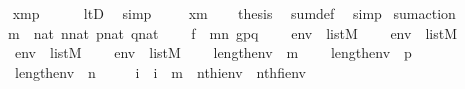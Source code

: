 \begin{isabellebody}
\ \ \isamarkupfalse%
\ {\isachardoublequoteopen}x{\isasymin}m{\isacharhash}{\kern0pt}{\isacharplus}{\kern0pt}p{\isachardoublequoteclose}\isanewline
\ \ \ \ \isamarkupfalse%
\ ltD\ \isamarkupfalse%
\ simp\isanewline
\ \ \isamarkupfalse%
\ {\isacartoucheopen}{\isasymnot}\ x{\isacharless}{\kern0pt}m{\isacartoucheclose}\isanewline
\ \ \isamarkupfalse%
\ {\isacharquery}{\kern0pt}thesis\ \isamarkupfalse%
\ sum{\isacharunderscore}{\kern0pt}def\ \isamarkupfalse%
\ simp\isanewline
{}\isamarkupfalse%
%
\endisatagproof
{\isafoldproof}%
%
\isadelimproof
\isanewline
%
\endisadelimproof
\isanewline
\isanewline
{}\isamarkupfalse%
\ sum{\isacharunderscore}{\kern0pt}action\ {\isacharcolon}{\kern0pt}\isanewline
\ \ \ {\isachardoublequoteopen}m\ {\isasymin}\ nat{\isachardoublequoteclose}\ {\isachardoublequoteopen}n{\isasymin}nat{\isachardoublequoteclose}\ {\isachardoublequoteopen}p{\isasymin}nat{\isachardoublequoteclose}\ {\isachardoublequoteopen}q{\isasymin}nat{\isachardoublequoteclose}\isanewline
\ \ \ \ {\isachardoublequoteopen}f\ {\isasymin}\ m{\isasymrightarrow}n{\isachardoublequoteclose}\ {\isachardoublequoteopen}g{\isasymin}p{\isasymrightarrow}q{\isachardoublequoteclose}\isanewline
\ \ \ \ {\isachardoublequoteopen}env\ {\isasymin}\ list{\isacharparenleft}{\kern0pt}M{\isacharparenright}{\kern0pt}{\isachardoublequoteclose}\isanewline
\ \ \ \ {\isachardoublequoteopen}env{\isacharprime}{\kern0pt}\ {\isasymin}\ list{\isacharparenleft}{\kern0pt}M{\isacharparenright}{\kern0pt}{\isachardoublequoteclose}\isanewline
\ \ \ \ {\isachardoublequoteopen}env{}\ {\isasymin}\ list{\isacharparenleft}{\kern0pt}M{\isacharparenright}{\kern0pt}{\isachardoublequoteclose}\isanewline
\ \ \ \ {\isachardoublequoteopen}env{}\ {\isasymin}\ list{\isacharparenleft}{\kern0pt}M{\isacharparenright}{\kern0pt}{\isachardoublequoteclose}\isanewline
\ \ \ \ {\isachardoublequoteopen}length{\isacharparenleft}{\kern0pt}env{\isacharparenright}{\kern0pt}\ {\isacharequal}{\kern0pt}\ m{\isachardoublequoteclose}\isanewline
\ \ \ \ {\isachardoublequoteopen}length{\isacharparenleft}{\kern0pt}env{}{\isacharparenright}{\kern0pt}\ {\isacharequal}{\kern0pt}\ p{\isachardoublequoteclose}\isanewline
\ \ \ \ {\isachardoublequoteopen}length{\isacharparenleft}{\kern0pt}env{\isacharprime}{\kern0pt}{\isacharparenright}{\kern0pt}\ {\isacharequal}{\kern0pt}\ n{\isachardoublequoteclose}\isanewline
\ \ \ \ {\isachardoublequoteopen}{\isasymAnd}\ i\ {\isachardot}{\kern0pt}\ i\ {\isacharless}{\kern0pt}\ m\ {\isasymLongrightarrow}\ nth{\isacharparenleft}{\kern0pt}i{\isacharcomma}{\kern0pt}env{\isacharparenright}{\kern0pt}\ {\isacharequal}{\kern0pt}\ nth{\isacharparenleft}{\kern0pt}f{\isacharbackquote}{\kern0pt}i{\isacharcomma}{\kern0pt}env{\isacharprime}{\kern0pt}{\isacharparenright}{\kern0pt}{\isachardoublequoteclose}\isanewline

\end{isabellebody}
